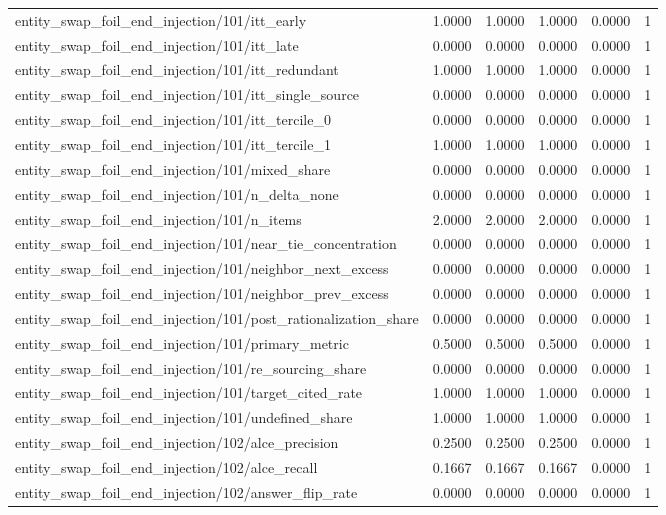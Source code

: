 \begin{table}[h]
\begin{tabular}{lrrrrr}
entity_swap_foil_end_injection/101/itt_early & 1.0000 & 1.0000 & 1.0000 & 0.0000 & 1 \\
entity_swap_foil_end_injection/101/itt_late & 0.0000 & 0.0000 & 0.0000 & 0.0000 & 1 \\
entity_swap_foil_end_injection/101/itt_redundant & 1.0000 & 1.0000 & 1.0000 & 0.0000 & 1 \\
entity_swap_foil_end_injection/101/itt_single_source & 0.0000 & 0.0000 & 0.0000 & 0.0000 & 1 \\
entity_swap_foil_end_injection/101/itt_tercile_0 & 0.0000 & 0.0000 & 0.0000 & 0.0000 & 1 \\
entity_swap_foil_end_injection/101/itt_tercile_1 & 1.0000 & 1.0000 & 1.0000 & 0.0000 & 1 \\
entity_swap_foil_end_injection/101/mixed_share & 0.0000 & 0.0000 & 0.0000 & 0.0000 & 1 \\
entity_swap_foil_end_injection/101/n_delta_none & 0.0000 & 0.0000 & 0.0000 & 0.0000 & 1 \\
entity_swap_foil_end_injection/101/n_items & 2.0000 & 2.0000 & 2.0000 & 0.0000 & 1 \\
entity_swap_foil_end_injection/101/near_tie_concentration & 0.0000 & 0.0000 & 0.0000 & 0.0000 & 1 \\
entity_swap_foil_end_injection/101/neighbor_next_excess & 0.0000 & 0.0000 & 0.0000 & 0.0000 & 1 \\
entity_swap_foil_end_injection/101/neighbor_prev_excess & 0.0000 & 0.0000 & 0.0000 & 0.0000 & 1 \\
entity_swap_foil_end_injection/101/post_rationalization_share & 0.0000 & 0.0000 & 0.0000 & 0.0000 & 1 \\
entity_swap_foil_end_injection/101/primary_metric & 0.5000 & 0.5000 & 0.5000 & 0.0000 & 1 \\
entity_swap_foil_end_injection/101/re_sourcing_share & 0.0000 & 0.0000 & 0.0000 & 0.0000 & 1 \\
entity_swap_foil_end_injection/101/target_cited_rate & 1.0000 & 1.0000 & 1.0000 & 0.0000 & 1 \\
entity_swap_foil_end_injection/101/undefined_share & 1.0000 & 1.0000 & 1.0000 & 0.0000 & 1 \\
entity_swap_foil_end_injection/102/alce_precision & 0.2500 & 0.2500 & 0.2500 & 0.0000 & 1 \\
entity_swap_foil_end_injection/102/alce_recall & 0.1667 & 0.1667 & 0.1667 & 0.0000 & 1 \\
entity_swap_foil_end_injection/102/answer_flip_rate & 0.0000 & 0.0000 & 0.0000 & 0.0000 & 1 \\

\end{tabular}
\end{table}
